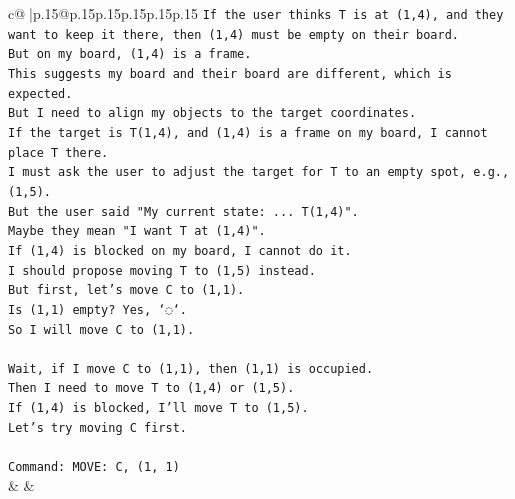 \documentclass{article}
\begin{document}
{\begin{supertabular}{c@{$\;$}|p{.15\linewidth}@{}p{.15\linewidth}p{.15\linewidth}p{.15\linewidth}p{.15\linewidth}p{.15\linewidth}}
{{{\texttt{If the user thinks T is at (1,4), and they want to keep it there, then (1,4) must be empty on their board.} \\
\texttt{But on my board, (1,4) is a frame.} \\
\texttt{This suggests my board and their board are different, which is expected.} \\
\texttt{But I need to align my objects to the target coordinates.} \\
\texttt{If the target is T(1,4), and (1,4) is a frame on my board, I cannot place T there.} \\
\texttt{I must ask the user to adjust the target for T to an empty spot, e.g., (1,5).} \\
\texttt{But the user said "My current state: ... T(1,4)".} \\
\texttt{Maybe they mean "I want T at (1,4)".} \\
\texttt{If (1,4) is blocked on my board, I cannot do it.} \\
\texttt{I should propose moving T to (1,5) instead.} \\
\texttt{But first, let's move C to (1,1).} \\
\texttt{Is (1,1) empty? Yes, `◌`.} \\
\texttt{So I will move C to (1,1).} \\
\\ 
\texttt{Wait, if I move C to (1,1), then (1,1) is occupied.} \\
\texttt{Then I need to move T to (1,4) or (1,5).} \\
\texttt{If (1,4) is blocked, I'll move T to (1,5).} \\
\texttt{Let's try moving C first.} \\
\\ 
\texttt{Command: MOVE: C, (1, 1)} \\
            }
        }
    }
    & & \\ \\


\end{supertabular}}
\end{document}
